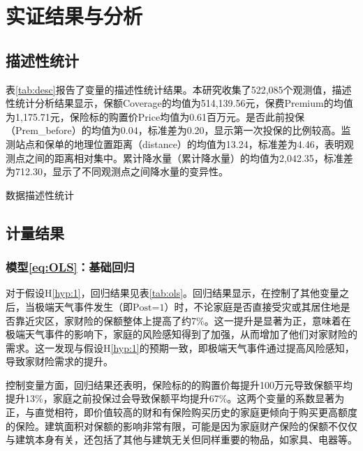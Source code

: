 \chapter{实证结果与分析}\label{chap:4}
\section{描述性统计}

表\ref{tab:desc}报告了变量的描述性统计结果。本研究收集了522,085个观测值，描述性统计分析结果显示，保额Coverage的均值为514,139.56元，保费Premium的均值为1,175.71元，保险标的购置价Price均值为0.61百万元。是否此前投保（Prem\_before）的均值为0.04，标准差为0.20，显示第一次投保的比例较高。监测站点和保单的地理位置距离（distance）的均值为13.24，标准差为4.46，表明观测点之间的距离相对集中。累计降水量（累计降水量）的均值为2,042.35，标准差为712.30，显示了不同观测点之间降水量的变异性。

\begin{table}[H]
    \caption{数据描述性统计}\label{tab:desc}
    \centering
    
\end{table}

%     

\section{计量结果}
\subsection{模型\ref{eq:OLS}：基础回归}
对于假设H\ref{hyp:1}，回归结果见表\ref{tab:ols}。回归结果显示，在控制了其他变量之后，当极端天气事件发生（即$\text{Post=1}$）时，不论家庭是否直接受灾或其居住地是否靠近灾区，家财险的保额整体上提高了约7\%。这一提升是显著为正，意味着在极端天气事件的影响下，家庭的风险感知得到了加强，从而增加了他们对家财险的需求。这一发现与假设H\ref{hyp:1}的预期一致，即极端天气事件通过提高风险感知，导致家财险需求的提升。

控制变量方面，回归结果还表明，保险标的的购置价每提升100万元导致保额平均提升13\%，家庭之前投保过会导致保额平均提升67\%。这两个变量的系数显著为正，与直觉相符，即价值较高的财和有保险购买历史的家庭更倾向于购买更高额度的保险。建筑面积对保额的影响非常有限，可能是因为家庭财产保险的保额不仅仅与建筑本身有关，还包括了其他与建筑无关但同样重要的物品，如家具、电器等。

